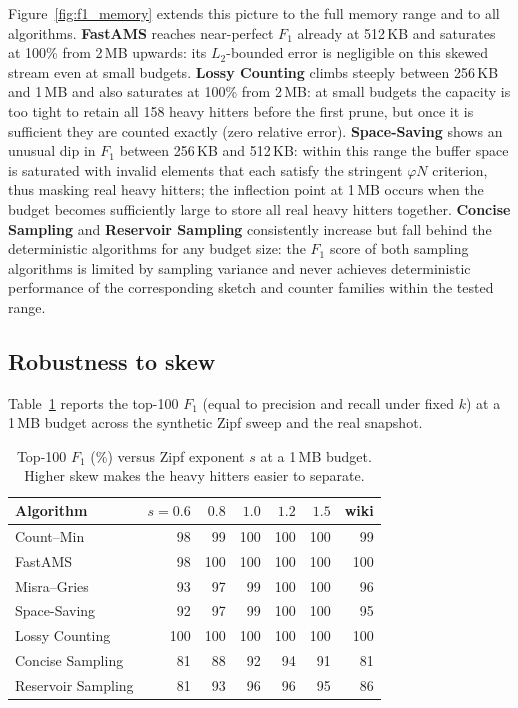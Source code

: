 \documentclass[12pt]{article}
\begin{document}
Figure~\ref{fig:f1_memory} extends this picture to the full memory range and to all algorithms.
\textbf{FastAMS} reaches near-perfect $F_1$ already at 512\,KB and saturates at 100\% from 2\,MB
upwards: its $L_2$-bounded error is negligible on this skewed stream even at small budgets.
\textbf{Lossy Counting} climbs steeply between 256\,KB and 1\,MB and also saturates at 100\%
from 2\,MB: at small budgets the capacity is too tight to retain all 158 heavy hitters before
the first prune, but once it is sufficient they are counted exactly (zero relative error).
\textbf{Space-Saving} shows an unusual dip in $F_1$ between 256\,KB and 512\,KB: within this range
the buffer space is saturated with invalid elements that each satisfy the stringent $\varphi N$ criterion,
thus masking real heavy hitters; the inflection point at 1\,MB occurs when the budget becomes
sufficiently large to store all real heavy hitters together.
\textbf{Concise Sampling} and \textbf{Reservoir Sampling} consistently increase but fall behind the
deterministic algorithms for any budget size: the $F_1$ score of both sampling algorithms is limited
by sampling variance and never achieves deterministic performance of the corresponding sketch and 
counter families within the tested range.

\subsection{Robustness to skew}

Table~\ref{tab:skew} reports the top-100 $F_1$ (equal to precision and recall
under fixed $k$) at a 1\,MB budget across the synthetic Zipf sweep and the real
snapshot.

\begin{table}[H]
\centering
\small
\begin{tabular}{lrrrrrr}
\hline
\textbf{Algorithm} & \textbf{$s{=}0.6$} & \textbf{$0.8$} & \textbf{$1.0$} & \textbf{$1.2$} & \textbf{$1.5$} & \textbf{wiki} \\
\hline
Count--Min         & 98 & 99  & 100 & 100 & 100 & 99  \\
FastAMS            & 98 & 100 & 100 & 100 & 100 & 100 \\
Misra--Gries       & 93 & 97  & 99  & 100 & 100 & 96  \\
Space-Saving       & 92 & 97  & 99  & 100 & 100 & 95  \\
Lossy Counting     & 100& 100 & 100 & 100 & 100 & 100 \\
Concise Sampling   & 81 & 88  & 92  & 94  & 91  & 81  \\
Reservoir Sampling & 81 & 93  & 96  & 96  & 95  & 86  \\
\hline
\end{tabular}
\caption{Top-100 $F_1$ (\%) versus Zipf exponent $s$ at a 1\,MB budget. Higher
skew makes the heavy hitters easier to separate.}
\label{tab:skew}
\end{table}
\end{document}
